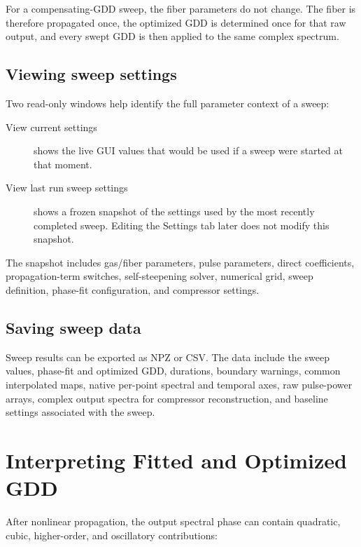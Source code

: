 \documentclass[11pt,a4paper]{article}
\begin{document}
For a compensating-GDD sweep, the fiber parameters do not change. The fiber is
therefore propagated once, the optimized GDD is determined once for that raw
output, and every swept GDD is then applied to the same complex spectrum.

\subsection{Viewing sweep settings}

Two read-only windows help identify the full parameter context of a sweep:

\begin{description}
    \item[View current settings] shows the live GUI values that would be used
    if a sweep were started at that moment.
    \item[View last run sweep settings] shows a frozen snapshot of the settings
    used by the most recently completed sweep. Editing the Settings tab later
    does not modify this snapshot.
\end{description}

The snapshot includes gas/fiber parameters, pulse parameters, direct
coefficients, propagation-term switches, self-steepening solver, numerical
grid, sweep definition, phase-fit configuration, and compressor settings.

\subsection{Saving sweep data}

Sweep results can be exported as NPZ or CSV. The data include the sweep values,
phase-fit and optimized GDD, durations, boundary warnings, common interpolated
maps, native per-point spectral and temporal axes, raw pulse-power arrays,
complex output spectra for compressor reconstruction, and baseline settings
associated with the sweep.

\section{Interpreting Fitted and Optimized GDD}

After nonlinear propagation, the output spectral phase can contain quadratic,
cubic, higher-order, and oscillatory contributions:
\end{document}

